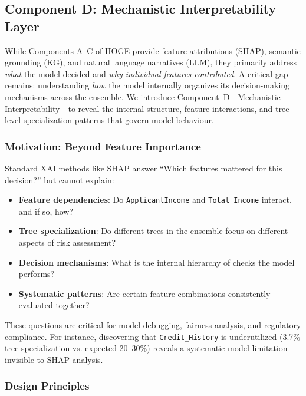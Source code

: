 
\subsection{Component D: Mechanistic Interpretability Layer}

While Components A--C of HOGE provide feature attributions (SHAP), semantic grounding (KG), and natural language narratives (LLM), they primarily address \emph{what} the model decided and \emph{why individual features contributed}. A critical gap remains: understanding \emph{how} the model internally organizes its decision-making mechanisms across the ensemble. We introduce Component~D---Mechanistic Interpretability---to reveal the internal structure, feature interactions, and tree-level specialization patterns that govern model behaviour.

\subsubsection{Motivation: Beyond Feature Importance}

Standard XAI methods like SHAP answer ``Which features mattered for this decision?'' but cannot explain:
\begin{itemize}
    \item \textbf{Feature dependencies}: Do \texttt{ApplicantIncome} and \texttt{Total\_Income} interact, and if so, how?
    \item \textbf{Tree specialization}: Do different trees in the ensemble focus on different aspects of risk assessment?
    \item \textbf{Decision mechanisms}: What is the internal hierarchy of checks the model performs?
    \item \textbf{Systematic patterns}: Are certain feature combinations consistently evaluated together?
\end{itemize}

These questions are critical for model debugging, fairness analysis, and regulatory compliance. For instance, discovering that \texttt{Credit\_History} is underutilized (3.7\% tree specialization vs. expected 20--30\%) reveals a systematic model limitation invisible to SHAP analysis.

\subsubsection{Design Principles}

